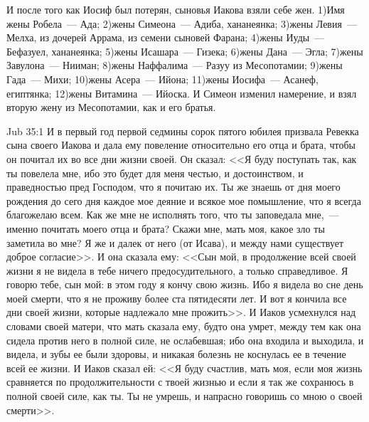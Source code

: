 И после того как Иосиф был потерян, сыновья
Иакова взяли себе жен. 1)Имя жены Робела~--- Ада;
2)жены Симеона~--- Адиба, хананеянка;
3)жены Левия~--- Мелха, из дочерей Аррама, из семени сыновей
Фарана; 4)жены Иуды~--- Бефазуел, хананеянка; 5)жены
Исашара~--- Гизека; 6)жены Дана~--- Эгла; 7)жены
Завулона~--- Нииман; 8)жены Наффалима~--- Разуу из
Месопотамии; 9)жены Гада~--- Михи; 10)жены Асера~---
Ийона; 11)жены Иосифа~--- Асанеф, египтянка; 12)жены
Витамина~--- Ийоска. И Симеон изменил намерение, и
взял вторую жену из Месопотамии, как и его братья.

\vs Jub 35:1
И в первый год первой седмины сорок пятого
юбилея призвала Ревекка сына своего Иакова и
дала ему повеление относительно его отца и брата,
чтобы он почитал их во все дни жизни своей. Он
сказал: <<Я буду поступать так, как ты повелела
мне, ибо это будет для меня честью, и
достоинством, и праведностью пред Господом, что я
почитаю их. Ты же знаешь от дня моего рождения до
сего дня каждое мое деяние и всякое мое
помышление, что я всегда благожелаю всем. Как же
мне не исполнять того, что ты заповедала мне,~--- именно
почитать моего отца и брата? Скажи мне, мать
моя, какое зло ты заметила во мне? Я же и далек от
него (от Исава), и между нами существует
доброе согласие>>. И она сказала ему: <<Сын мой,
в продолжение всей своей жизни я не видела в тебе
ничего предосудительного, а только
справедливое. Я говорю тебе, сын мой: в этом году я
кончу свою жизнь. Ибо я видела во сне день
моей смерти, что я не проживу более ста
пятидесяти лет. И вот я кончила все дни своей
жизни, которые надлежало мне прожить>>. И Иаков
усмехнулся над словами своей матери, что мать
сказала ему, будто она умрет, между тем как она
сидела против него в полной силе, не ослабевшая;
ибо она входила и выходила, и видела, и зубы ее
были здоровы, и никакая болезнь не коснулась ее в
течение всей ее жизни. И Иаков сказал ей: <<Я
буду счастлив, мать моя, если моя жизнь
сравняется по продолжительности с твоей жизнью и
если я так же сохранюсь в полной своей силе, как
ты. Ты не умрешь, и напрасно говоришь со мною о
своей смерти>>.

